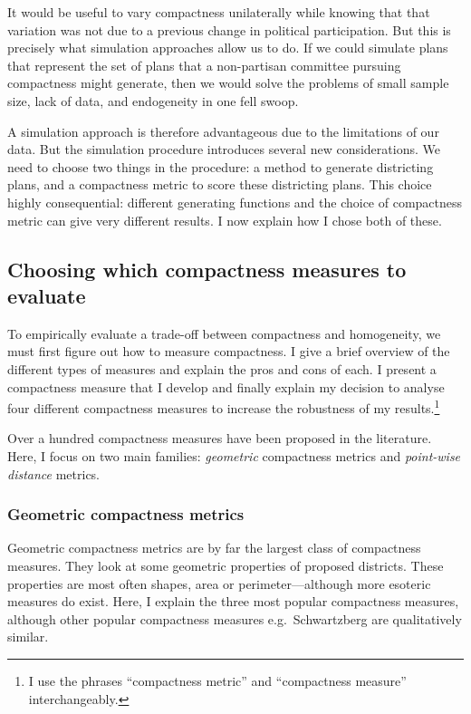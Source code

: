 \documentclass[]{article}
\begin{document}
It would be useful to vary compactness unilaterally while knowing that
that variation was not due to a previous change in political
participation. But this is precisely what simulation approaches allow us
to do. If we could simulate plans that represent the set of plans that a
non-partisan committee pursuing compactness might generate, then we
would solve the problems of small sample size, lack of data, and
endogeneity in one fell swoop.

A simulation approach is therefore advantageous due to the limitations
of our data. But the simulation procedure introduces several new
considerations. We need to choose two things in the procedure: a method
to generate districting plans, and a compactness metric to score these
districting plans. This choice highly consequential: different
generating functions and the choice of compactness metric can give very
different results. I now explain how I chose both of these.

\hypertarget{choosing-which-compactness-measures-to-evaluate}{%
\subsection{Choosing which compactness measures to
evaluate}\label{choosing-which-compactness-measures-to-evaluate}}

To empirically evaluate a trade-off between compactness and homogeneity,
we must first figure out how to measure compactness. I give a brief
overview of the different types of measures and explain the pros and
cons of each. I present a compactness measure that I develop and finally
explain my decision to analyse four different compactness measures to
increase the robustness of my results.\footnote{I use the phrases
  ``compactness metric'' and ``compactness measure'' interchangeably.}

Over a hundred compactness measures have been proposed in the
literature. Here, I focus on two main families: \emph{geometric}
compactness metrics and \emph{point-wise distance} metrics.

\hypertarget{geometric-compactness-metrics}{%
\subsubsection{Geometric compactness
metrics}\label{geometric-compactness-metrics}}

Geometric compactness metrics are by far the largest class of
compactness measures. They look at some geometric properties of proposed
districts. These properties are most often shapes, area or
perimeter---although more esoteric measures do exist. Here, I explain
the three most popular compactness measures, although other popular
compactness measures e.g.~Schwartzberg are qualitatively similar.
\end{document}
